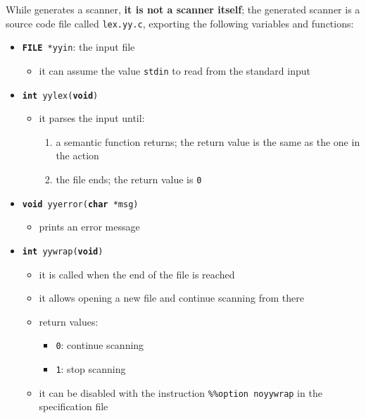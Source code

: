 \documentclass[english]{article}
\begin{document}
While \flex generates a scanner, \textbf{it is not a scanner itself};
the generated scanner is a \clang source code file called \texttt{lex.yy.c}, exporting the following variables and functions:

\begin{itemize}[label=\texttt{>}]
  \item \texttt{\textbf{FILE} *yyin}: the input file
        \begin{itemize}
          \item it can assume the value \texttt{stdin} to read from the standard input
        \end{itemize}
  \item \texttt{\textbf{int} yylex(\textbf{void})}
        \begin{itemize}
          \item it parses the input until:
                \begin{enumerate}
                  \item a semantic function returns; the return value is the same as the one in the action
                  \item the file ends; the return value is \texttt{0}
                \end{enumerate}
        \end{itemize}
  \item \texttt{\textbf{void} yyerror(\textbf{char} *msg)}
        \begin{itemize}
          \item prints an error message
        \end{itemize}
  \item \texttt{\textbf{int} yywrap(\textbf{void})}
        \begin{itemize}
          \item it is called when the end of the file is reached
          \item it allows opening a new file and continue scanning from there
          \item return values:
                \begin{itemize}
                  \item \texttt{0}: continue scanning
                  \item \texttt{1}: stop scanning
                \end{itemize}
          \item it can be disabled with the instruction \texttt{\%\%option noyywrap} in the specification file
        \end{itemize}
\end{itemize}
\end{document}
